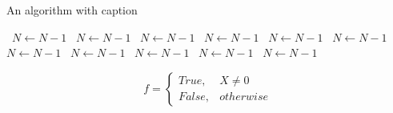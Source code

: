 \documentclass[a4paper]{article}
\begin{document}
\begin{algorithm}
\caption{An algorithm with caption}
\begin{algorithmic}
\    \State $N \gets N - 1$
\    \State $N \gets N - 1$
\    \State $N \gets N - 1$
\    \State $N \gets N - 1$
\    \State $N \gets N - 1$
\    \State $N \gets N - 1$
\    \State $N \gets N - 1$
\    \State $N \gets N - 1$
\    \State $N \gets N - 1$
\    \State $N \gets N - 1$
\    \State $N \gets N - 1$
\EndWhile
\end{algorithmic}
\end{algorithm}

\begin{equation}   f =
\begin{cases} True, & X \neq 0\\
False, & otherwise
\end{cases}
\end{equation}
\end{document}
